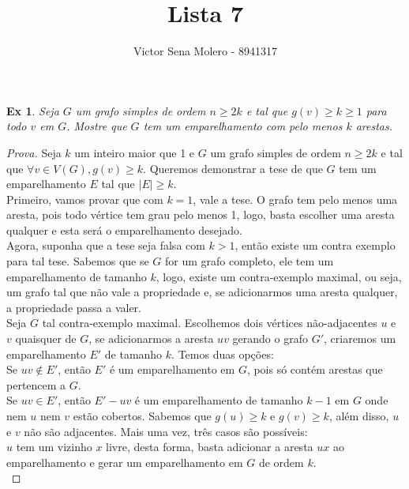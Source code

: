 \documentclass[12pt]{article}
\newcounter{exCounter}
\newtheorem{ex}[exCounter]{Ex}
\begin{document}
 
 
\title{Lista 7}
\author{Victor Sena Molero - 8941317}
\maketitle

\begin{ex}
Seja $G$ um grafo simples de ordem $n \geq 2k$ e tal que $g(v) \geq k \geq 1$ para todo $v$ em $G$. Mostre que $G$ tem um emparelhamento com pelo menos $k$ arestas.
\end{ex}

\begin{proof}[Prova]
Seja $k$ um inteiro maior que 1 e $G$ um grafo simples de ordem $n \geq 2k$ e tal que $\forall v \in V(G), g(v) \geq k$. Queremos demonstrar a tese de que $G$ tem um emparelhamento $E$ tal que $|E| \geq k$. \\
Primeiro, vamos provar que com $k = 1$, vale a tese. O grafo tem pelo menos uma aresta, pois todo vértice tem grau pelo menos 1, logo, basta escolher uma aresta qualquer e esta será o emparelhamento desejado. \\
Agora, suponha que a tese seja falsa com $k > 1$, então existe um contra exemplo para tal tese. Sabemos que se $G$ for um grafo completo, ele tem um emparelhamento de tamanho $k$, logo, existe um contra-exemplo maximal, ou seja, um grafo tal que não vale a propriedade e, se adicionarmos uma aresta qualquer, a propriedade passa a valer. \\
Seja $G$ tal contra-exemplo maximal. Escolhemos dois vértices não-adjacentes $u$ e $v$ quaisquer de $G$, se adicionarmos a aresta $uv$ gerando o grafo $G'$, criaremos um emparelhamento $E'$ de tamanho $k$. Temos duas opções: \\
Se $uv \notin E'$, então $E'$ é um emparelhamento em $G$, pois só contém arestas que pertencem a $G$. \\
Se $uv \in E'$, então $E' - uv$ é um emparelhamento de tamanho $k-1$ em $G$ onde nem $u$ nem $v$ estão cobertos. Sabemos que $g(u) \geq k$ e $g(v) \geq k$, além disso, $u$ e $v$ não são adjacentes. Mais uma vez, três casos são possíveis: \\
$u$ tem um vizinho $x$ livre, desta forma, basta adicionar a aresta $ux$ ao emparelhamento e gerar um emparelhamento em $G$ de ordem $k$. \\

\end{proof}
\end{document}
